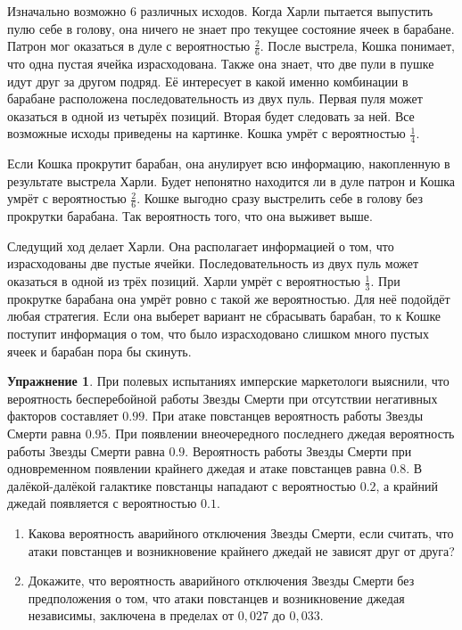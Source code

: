 \documentclass[12pt, a4paper, oneside]{extreport}
\theoremstyle{plain}              %
\theoremstyle{definition}         %
\newtheorem{problem}{\color{myblue} Упражнение}
\begin{document}
\begin{sol}
Изначально возможно $6$ различных исходов. Когда Харли пытается выпустить пулю себе в голову, она ничего не знает про текущее состояние ячеек в барабане.  Патрон мог оказаться в дуле с вероятностью $\frac{2}{6}$. После выстрела, Кошка понимает, что одна пустая ячейка израсходована. Также она знает, что две пули в пушке идут друг за другом подряд. Её интересует в какой именно комбинации в барабане расположена последовательность из двух пуль. Первая пуля может оказаться в одной из четырёх позиций. Вторая будет следовать за ней. Все возможные исходы приведены на картинке. Кошка умрёт с вероятностью $\frac{1}{4}$.



Если Кошка прокрутит барабан, она анулирует всю информацию, накопленную в результате выстрела Харли. Будет непонятно находится ли в дуле патрон и Кошка умрёт с вероятностью $\frac{2}{6}$. Кошке выгодно сразу выстрелить себе в голову без прокрутки барабана. Так вероятность того, что она выживет выше.

Следущий ход делает Харли. Она располагает информацией о том, что израсходованы две пустые ячейки. Последовательность из двух пуль может оказаться в одной из трёх позиций. Харли умрёт с вероятностью $\frac{1}{3}$. При прокрутке барабана она умрёт ровно с такой же вероятностью. Для неё подойдёт любая стратегия. Если она выберет вариант не сбрасывать барабан, то к Кошке поступит информация о том, что было израсходовано слишком много пустых ячеек и барабан пора бы скинуть.
\end{sol} 

\begin{problem}

При полевых испытаниях имперские маркетологи выяснили, что вероятность бесперебойной работы Звезды Смерти при отсутствии негативных факторов составляет $0.99$. При атаке повстанцев вероятность работы Звезды Смерти равна $0.95$. При появлении внеочередного последнего джедая вероятность работы Звезды Смерти равна $0.9$.  Вероятность работы Звезды Смерти при одновременном появлении крайнего джедая и атаке повстанцев равна $0.8$.  В далёкой-далёкой галактике повстанцы нападают с вероятностью $0.2$, а крайний джедай появляется с вероятностью $0.1$. 
	
\begin{enumerate}
\item  Какова вероятность аварийного отключения Звезды Смерти, если считать, что атаки повстанцев и возникновение крайнего джедай не зависят друг от друга?
\item  Докажите, что вероятность аварийного отключения Звезды Смерти без предположения о том, что атаки повстанцев и возникновение джедая независимы, заключена в пределах от $0,027$ до $0,033$.
\end{enumerate} 
\end{problem}
\end{document}
